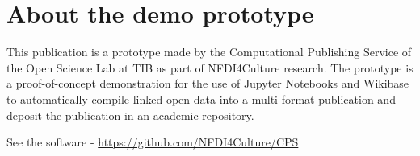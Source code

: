 \documentclass[
  a4paper,
]{scrreprt}
\begin{document}
\section{About the demo prototype}\label{about-the-demo-prototype}

This publication is a prototype made by the Computational Publishing
Service of the Open Science Lab at TIB as part of NFDI4Culture research.
The prototype is a proof-of-concept demonstration for the use of Jupyter
Notebooks and Wikibase to automatically compile linked open data into a
multi-format publication and deposit the publication in an academic
repository.

See the software - \url{https://github.com/NFDI4Culture/CPS}



\printindex
\end{document}
